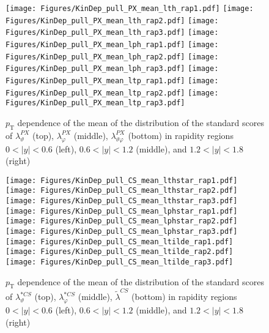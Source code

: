 \documentclass[12pt]{article}
\newcommand{\pT}{p_\mathrm{T}}
\newcommand{\absy}{\left |  y \right |}
\newcommand{\lamtildeCS}{\tilde{\lambda}^{\scriptscriptstyle CS}}
\newcommand{\lamthstarCS}{\lambda^{* \scriptscriptstyle CS}_\vartheta}
\newcommand{\lamphstarCS}{\lambda^{* \scriptscriptstyle CS}_\varphi}
\newcommand{\lamthPX}{\lambda^{\scriptscriptstyle PX}_\vartheta}
\newcommand{\lamphPX}{\lambda^{\scriptscriptstyle PX}_\varphi}
\newcommand{\lamthphPX}{\lambda^{\scriptscriptstyle PX}_{\vartheta \varphi}}
\begin{document}
\begin{figure}[htbp]
\centering
\texttt{[image: Figures/KinDep\_pull\_PX\_mean\_lth\_rap1.pdf]}
\texttt{[image: Figures/KinDep\_pull\_PX\_mean\_lth\_rap2.pdf]}
\texttt{[image: Figures/KinDep\_pull\_PX\_mean\_lth\_rap3.pdf]}
\texttt{[image: Figures/KinDep\_pull\_PX\_mean\_lph\_rap1.pdf]}
\texttt{[image: Figures/KinDep\_pull\_PX\_mean\_lph\_rap2.pdf]}
\texttt{[image: Figures/KinDep\_pull\_PX\_mean\_lph\_rap3.pdf]}
\texttt{[image: Figures/KinDep\_pull\_PX\_mean\_ltp\_rap1.pdf]}
\texttt{[image: Figures/KinDep\_pull\_PX\_mean\_ltp\_rap2.pdf]}
\texttt{[image: Figures/KinDep\_pull\_PX\_mean\_ltp\_rap3.pdf]}
\caption{$\pT$ dependence of the mean of the distribution of the standard scores
of $\lamthPX$ (top), $\lamphPX$ (middle), $\lamthphPX$ (bottom) in rapidity
regions $0<\absy<0.6$ (left), $0.6<\absy<1.2$ (middle), and $1.2<\absy<1.8$ (right)}
\end{figure}
\clearpage


\begin{figure}[htbp]
\centering
\texttt{[image: Figures/KinDep\_pull\_CS\_mean\_lthstar\_rap1.pdf]}
\texttt{[image: Figures/KinDep\_pull\_CS\_mean\_lthstar\_rap2.pdf]}
\texttt{[image: Figures/KinDep\_pull\_CS\_mean\_lthstar\_rap3.pdf]}
\texttt{[image: Figures/KinDep\_pull\_CS\_mean\_lphstar\_rap1.pdf]}
\texttt{[image: Figures/KinDep\_pull\_CS\_mean\_lphstar\_rap2.pdf]}
\texttt{[image: Figures/KinDep\_pull\_CS\_mean\_lphstar\_rap3.pdf]}
\texttt{[image: Figures/KinDep\_pull\_CS\_mean\_ltilde\_rap1.pdf]}
\texttt{[image: Figures/KinDep\_pull\_CS\_mean\_ltilde\_rap2.pdf]}
\texttt{[image: Figures/KinDep\_pull\_CS\_mean\_ltilde\_rap3.pdf]}
\caption{$\pT$ dependence of the mean of the distribution of the standard scores
of $\lamthstarCS$ (top), $\lamphstarCS$ (middle), $\lamtildeCS$ (bottom) in rapidity
regions $0<\absy<0.6$ (left), $0.6<\absy<1.2$ (middle), and $1.2<\absy<1.8$ (right)}
\end{figure}
\clearpage
\end{document}
